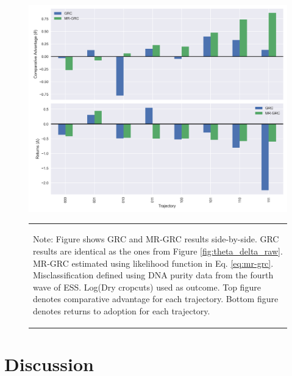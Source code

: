 \documentclass[11pt]{article}
\begin{document}
\begin{figure}
    \centering
    \includegraphics[scale=0.7]{results/figures/mr-theta.png}
    \caption{Comparative Advantage and Returns to Adoption: GRC and MR-GRC Results}
    \label{fig:mr-grc}
            \vspace*{-2em}
    \begin{table}[H]
        \centering
        \begin{tabular}{p{}} 
            \begin{tablenotes}
                  \small
                  \item Note: Figure shows GRC and MR-GRC results side-by-side. GRC results are identical as the ones from Figure \ref{fig:theta_delta_raw}. MR-GRC estimated using likelihood function in Eq. \ref{eq:mr-grc}. Misclassification defined using DNA purity data from the fourth wave of ESS. Log(Dry cropcuts) used as outcome. Top figure denotes comparative advantage for each trajectory. Bottom figure denotes returns to adoption for each trajectory.
            \end{tablenotes}
        \end{tabular}
    \end{table}
\end{figure}


\section{Discussion}\label{sec:disc}
\end{document}
